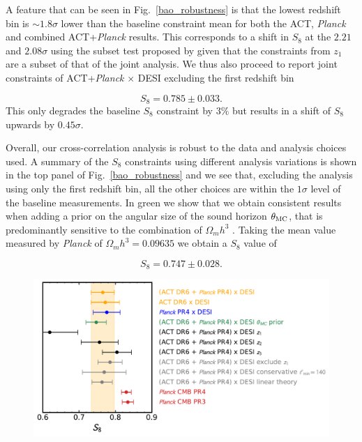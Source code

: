 \documentclass[twocolumn]{aastex631}
\newcommand{\Frank}[1]{\textcolor{red}{(FJQ: #1)}}
\begin{document}
{A feature that can be seen in Fig.~\ref{bao_robustness} is that the lowest redshift bin is $\sim1.8\sigma$  lower than the baseline constraint mean for both the ACT, \textit{Planck} and combined ACT+\textit{Planck} results. This corresponds to a shift in $S_8$ at the $2.21$ and $2.08\sigma$  using the subset test proposed by \cite{Gratton_2020} given that the constraints from $z_1$ are a subset of that of the joint analysis. We thus also proceed to report joint constraints of ACT+\textit{Planck} $\times$ DESI excluding the first redshift bin

\begin{equation}
    S_8=0.785\pm0.033.
\end{equation}
This only degrades the baseline $S_8$ constraint by $3\%$ but results in a shift of $S_8$ upwards by $0.45\sigma$. 

Overall, our cross-correlation analysis is robust to the data and analysis choices used. A summary of the $S_8$ constraints using different analysis variations is shown in the top panel of Fig.~\ref{bao_robustness} and we see that, excluding the analysis using only the first redshift bin, all the other choices are within the $1\sigma$ level of the baseline measurements. In green we show that we obtain consistent results when adding a prior on the angular size of the sound horizon $\theta_{\rm{MC}}$, that is predominantly sensitive to the combination of $\Omega_m h^3$ \citep{Percival_2002}. Taking the mean value measured by \textit{Planck} \citep{Planck2018Param} of  $\Omega_m h^3=0.09635$ we obtain a $S_8$ value of

\begin{equation}
    S_8=0.747\pm0.028.
\end{equation}

\begin{figure}
    \centering
    \includegraphics[width=\linewidth]{figures/S8_robustness.pdf} \\ %
    \vspace{-8pt} %
    

\end{figure}}
\end{document}
